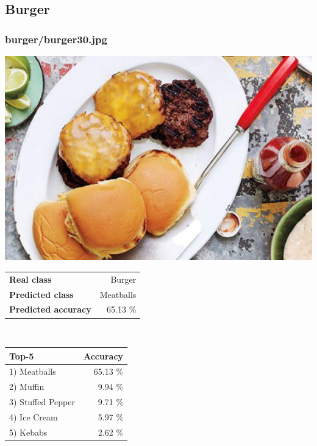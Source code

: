 \subsection{Burger}
    
\subsubsection{burger/burger30.jpg}

\begin{minipage}[t]{0.4\textwidth}
	\vspace{0pt}
	\includegraphics[width=\linewidth]{images/evaluation-images/burger/burger30.jpg}
\end{minipage}
\hfill
\begin{minipage}[t]{0.5\textwidth}
	\vspace{0pt}\raggedright
	\begin{tabularx}{\textwidth}{X r}
		\small \textbf{Real class} & \small Burger\\
		\small \textbf{Predicted class} & \small Meatballs\\
		\small \textbf{Predicted accuracy} & \small 65.13 \%
    \end{tabularx}\\
    
    \vspace{6pt}
	\begin{tabularx}{\textwidth}{X r}
        \small \textbf{Top-5} & \small \textbf{Accuracy} \\
        \hline
		\small 1) Meatballs & \small 65.13 \%\\\small 2) Muffin & \small 9.94 \%\\\small 3) Stuffed Pepper & \small 9.71 \%\\\small 4) Ice Cream & \small 5.97 \%\\\small 5) Kebabs & \small 2.62 \%
    \end{tabularx}
\end{minipage}
    
